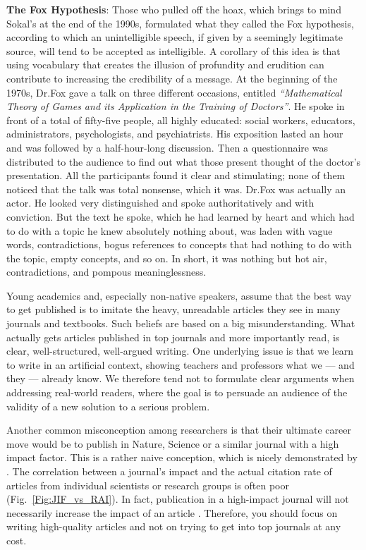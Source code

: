 \documentclass[graybox,envcountchap,sectrefs,UStrade]{svmono}
\newenvironment{fminipage}{\begin{Sbox}\begin{minipage}}{\end{minipage}\end{Sbox}\fbox{\TheSbox}}
\begin{document}
\bigskip
\begin{fminipage}{.9\textwidth}{\footnotesize{\textsf{\textbf{The Fox Hypothesis}}: Those who pulled off the hoax, which brings to mind Sokal's at the end of the 1990s, formulated what they called the Fox hypothesis, according to which an unintelligible speech, if given by a seemingly legitimate source, will tend to be accepted as intelligible. A corollary of this idea is that using vocabulary that creates the illusion of profundity and erudition can contribute to increasing the credibility of a message. At the beginning of the 1970s, Dr.\@ Fox gave a talk on three different occasions, entitled \emph{``Mathematical Theory of Games and its Application in the Training of Doctors''}. He spoke in front of a total of fifty-five people, all highly educated: social workers, educators, administrators, psychologists, and psychiatrists. His exposition lasted an hour and was followed by a half-hour-long discussion. Then a questionnaire was distributed to the audience to find out what those present thought of the doctor's presentation. All the participants found it clear and stimulating; none of them noticed that the talk was total nonsense, which it was. Dr.\@ Fox was actually an actor. He looked very distinguished and spoke authoritatively and with conviction. But the text he spoke, which he had learned by heart and which had to do with a topic he knew absolutely nothing about, was laden with vague words, contradictions, bogus references to concepts that had nothing to do with the topic, empty concepts, and so on. In short, it was nothing but hot air, contradictions, and pompous meaninglessness.} }
\end{fminipage}
\bigskip

Young academics and, especially non-native speakers, assume that the best way to get published is to imitate the heavy, unreadable articles they see in many journals and textbooks. Such beliefs are based on a big misunderstanding. What actually gets articles published in top journals and more importantly read, is clear, well-structured, well-argued writing. One underlying issue is that we learn to write in an artificial context, showing teachers and professors what we --- and they --- already know. We therefore tend not to formulate clear arguments when addressing real-world readers, where the goal is to persuade an audience of the validity of a new solution to a serious problem.\par

Another common misconception among researchers is that their ultimate career move would be to publish in Nature, Science or a similar journal with a high impact factor. This is a rather naive conception, which is nicely demonstrated by \citet{Seglen1997BMJ}. The correlation between a journal's impact and the actual citation rate of articles from individual scientists or research groups is often poor (Fig.\@~\ref{Fig:JIF_vs_RAI}). In fact, publication in a high-impact journal will not necessarily increase the impact of an article \citep{Seglen1997BMJ}. Therefore, you should focus on writing high-quality articles and not on trying to get into top journals at any cost.\par
\end{document}
